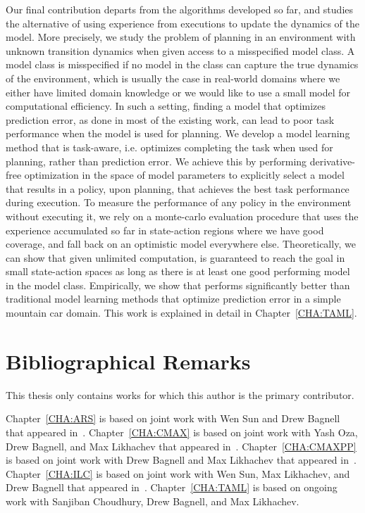 Our final contribution departs from the algorithms developed so far, and studies
the alternative of using experience from executions to update the dynamics of
the model. More precisely, we study the problem of planning in an environment
with unknown transition dynamics when given access to a misspecified model
class. A model class is misspecified if no model in the class can capture the
true dynamics of the environment, which is usually the case in real-world
domains where we either have limited domain knowledge or we would like to use a
small model for computational efficiency. In such a setting, finding a model
that optimizes prediction error, as done in most of the existing work, can
lead to poor task performance when the model is used for planning. We develop a
model learning method \taml{} that is task-aware, i.e. optimizes completing the task
when used for planning, rather than prediction error. We achieve this
by performing derivative-free optimization in the space of model
parameters to explicitly select a model that 
results in a policy, upon planning, that achieves the best task performance
during execution. To measure the performance of any policy in the
environment without executing it, we rely on a monte-carlo evaluation procedure
that uses the experience accumulated so far in
state-action regions where we have good coverage, and fall back on an
optimistic model everywhere else. Theoretically, we can show that given
unlimited computation, \taml{} is guaranteed to reach the goal in
small state-action spaces as long as there is at least one good
performing model in the model class. Empirically, we show that \taml{} performs
significantly better than traditional model learning methods that optimize
prediction error in a simple mountain car domain. This work is explained in
detail in Chapter~\ref{CHA:TAML}.

\section{Bibliographical Remarks}
\label{sec:bibl-remarks}

This thesis only contains works for which this author is the primary
contributor.

Chapter~\ref{CHA:ARS} is based on joint work with Wen Sun and Drew Bagnell
that appeared in~\cite{aistats19}.
Chapter~\ref{CHA:CMAX} is based on joint work with Yash Oza, Drew Bagnell, and Max
Likhachev that appeared in~\cite{cmax}.
Chapter~\ref{CHA:CMAXPP} is based on joint work with Drew Bagnell and Max
Likhachev that appeared in~\cite{cmaxpp}.
Chapter~\ref{CHA:ILC} is based on joint work with Wen Sun, Max Likhachev,
and Drew Bagnell that appeared in~\cite{ilc}.
Chapter~\ref{CHA:TAML} is based on ongoing work with Sanjiban Choudhury, Drew
Bagnell, and Max Likhachev.

